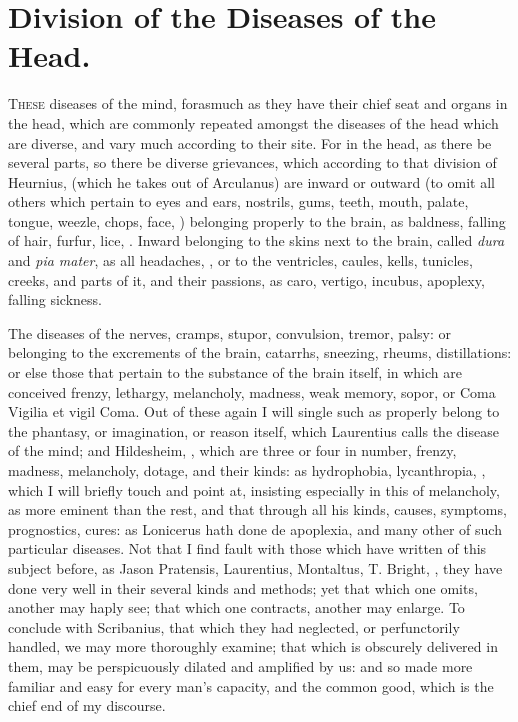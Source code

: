 {\section{Division of the Diseases of the Head.}

\lettrine{T}{hese} diseases of the mind, forasmuch as they have their chief seat and
organs in the head, which are commonly repeated amongst the diseases of
the head which are diverse, and vary much according to their site. For
in the head, as there be several parts, so there be diverse grievances,
which according to that division of Heurnius, (which he takes out
of Arculanus) are inward or outward (to omit all others which pertain
to eyes and ears, nostrils, gums, teeth, mouth, palate, tongue, weezle,
chops, face, \etc{}) belonging properly to the brain, as baldness, falling
of hair, furfur, lice, \etc{}. Inward belonging to the skins next to
the brain, called \emph{dura} and \emph{pia mater}, as all headaches, \etc{}, or to
the ventricles, caules, kells, tunicles, creeks, and parts of it, and
their passions, as caro, vertigo, incubus, apoplexy, falling sickness.

The diseases of the nerves, cramps, stupor, convulsion, tremor, palsy:
or belonging to the excrements of the brain, catarrhs, sneezing,
rheums, distillations: or else those that pertain to the substance of
the brain itself, in which are conceived frenzy, lethargy, melancholy,
madness, weak memory, sopor, or Coma Vigilia et vigil Coma. Out of
these again I will single such as properly belong to the phantasy, or
imagination, or reason itself, which Laurentius calls the disease
of the mind; and Hildesheim, ,
 which are three or four in number, frenzy, madness, melancholy, dotage, and their kinds:
as hydrophobia, lycanthropia, , which I will briefly touch
and point at, insisting especially in this of melancholy, as more
eminent than the rest, and that through all his kinds, causes,
symptoms, prognostics, cures: as Lonicerus hath done de apoplexia, and
many other of such particular diseases. Not that I find fault with
those which have written of this subject before, as Jason Pratensis,
Laurentius, Montaltus, T. Bright, \etc{}, they have done very well in
their several kinds and methods; yet that which one omits, another may
haply see; that which one contracts, another may enlarge. To conclude
with Scribanius, that which they had neglected, or perfunctorily
handled, we may more thoroughly examine; that which is obscurely
delivered in them, may be perspicuously dilated and amplified by us:
and so made more familiar and easy for every man's capacity, and the
common good, which is the chief end of my discourse.

}
